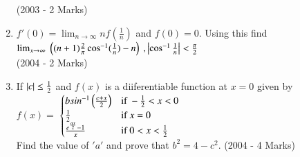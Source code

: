 \documentclass[journal,12pt,onecolumn]{IEEEtran}
\theoremstyle{remark}
\begin{document}
\begin{enumerate}
	\hfill (2003 - 2 Marks)
\item $f'(0) = \lim_{n \to \infty} nf(\frac{1}{n})$ and $f(0) = 0$. Using this find\\
	$\lim_{x \to \infty}\ \brak{(n+1)\frac{2}{\pi}\cos^{-1}(\frac{1}{n})-n}\ , \abs{\cos^{-1}\frac{1}{n}}<\frac{\pi}{2}$\\  
\hfill (2004 - 2 Marks)
\item If $\left\vert c\right\vert \leq \frac{1}{2}$ and $f(x)$ is a diiferentiable function at $x = 0$ given by\\
$f(x) = $
$\begin{cases}
	bsin^{-1} \brak{\frac{c + x}{2}} & \text{if}\ -\frac{1}{2}<x<0\\
    \frac{1}{2} & \text{if}\ x=0\\
    \frac{e^\frac{ax}{2} - 1}{x} & \text{if}\ 0<x<\frac{1}{2}
\end{cases}$\\
Find the value of $'a'$ and prove that $b^2 = 4 - c^2$.
\hfill (2004 - 4 Marks)






      
\end{enumerate}
\end{document}
